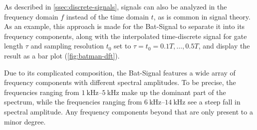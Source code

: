 As described in \cref{ssec:discrete-signals}, signals can also be analyzed in the frequency domain $f$ instead of the time domain $t$, as is common in signal theory. As an example, this approach is made for the Bat-Signal to separate it into its frequency components, along with the interpolated time-discrete signal for gate length $\tau$ and sampling resolution $t_0$ set to $\tau = t_0 = 0.1T, \dotsc ,0.5T$, and display the result as a bar plot (\cref{fig:batman-dft}).

Due to its complicated composition, the Bat-Signal features a wide array of frequency components with different spectral amplitudes. To be precise, the frequencies ranging from $\SIrange{1}{5}{\kilo\hertz}$ make up the dominant part of the spectrum, while the frequencies ranging from $\SIrange{6}{14}{\kilo\hertz}$ see a steep fall in spectral amplitude. Any frequency components beyond that are only present to a minor degree.

